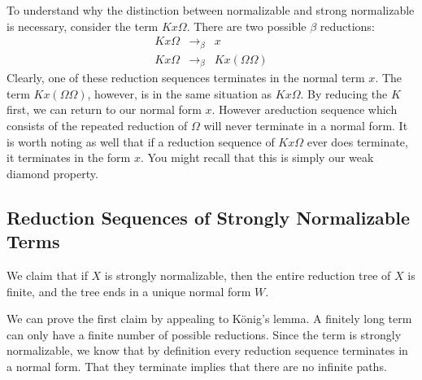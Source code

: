 To understand why the distinction between normalizable and strong normalizable is necessary, consider the term $Kx\Omega$. There are two possible $\beta$ reductions:
\begin{eqnarray*}
  Kx\Omega &\rightarrow_\beta& x\\
  Kx\Omega &\rightarrow_\beta& Kx(\Omega\Omega)
\end{eqnarray*}
Clearly, one of these reduction sequences terminates in the normal term $x$. The term $Kx(\Omega\Omega)$, however, is in the same situation as $Kx\Omega$. By reducing the $K$ first, we can return to our normal form $x$. However areduction sequence which consists of the repeated reduction of $\Omega$ will never terminate in a normal form. It is worth noting as well that if a reduction sequence of $Kx\Omega$ ever does terminate, it terminates in the form $x$. You might recall that this is simply our weak diamond property.
\begin{center}
\end{center}

\subsection{Reduction Sequences of Strongly Normalizable Terms}
We claim that if $X$ is strongly normalizable, then the entire reduction tree of $X$ is finite, and the tree ends in a unique normal form $W$.
\begin{center}
\end{center}

We can prove the first claim by appealing to K\"onig's lemma. A finitely long term can only have a finite number of possible reductions. Since the term is strongly normalizable, we know that by definition every reduction sequence terminates in a normal form. That they terminate implies that there are no infinite paths.\\

